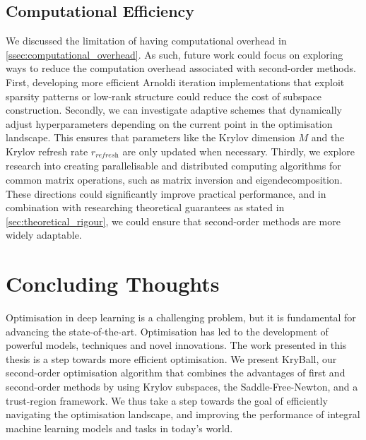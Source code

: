 \subsection{Computational Efficiency}
\label{ssec:computational_efficiency}
We discussed the limitation of having computational overhead in \cref{ssec:computational_overhead}. As such, future work could focus on exploring ways to reduce the computation overhead associated with second-order methods. First, developing more efficient Arnoldi iteration implementations that exploit sparsity patterns or low-rank structure could reduce the cost of subspace construction. Secondly, we can investigate adaptive schemes that dynamically adjust hyperparameters depending on the current point in the optimisation landscape. This ensures that parameters like the Krylov dimension $M$ and the Krylov refresh rate $r_\textit{refresh}$ are only updated when necessary. Thirdly, we explore research into creating parallelisable and distributed computing algorithms for common matrix operations, such as matrix inversion and eigendecomposition. These directions could significantly improve practical performance, and in combination with researching theoretical guarantees as stated in \cref{sec:theoretical_rigour}, we could ensure that second-order methods are more widely adaptable.

\section{Concluding Thoughts}
\label{sec:concluding_thoughts}

Optimisation in deep learning is a challenging problem, but it is fundamental for advancing the state-of-the-art. Optimisation has led to the development of powerful models, techniques and novel innovations. The work presented in this thesis is a step towards more efficient optimisation. We present KryBall, our second-order optimisation algorithm that combines the advantages of first and second-order methods by using Krylov subspaces, the Saddle-Free-Newton, and a trust-region framework. We thus take a step towards the goal of efficiently navigating the optimisation landscape, and improving the performance of integral machine learning models and tasks in today's world.